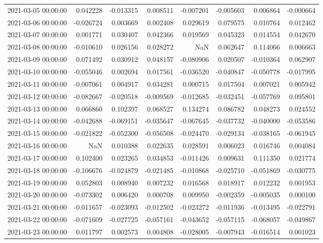\begin{tabular}{lrrrrrrr}
2021-03-05 00:00:00 & 0.042228 & -0.013315 & 0.008511 & -0.007201 & -0.005603 & 0.006864 & -0.000664 \\
2021-03-06 00:00:00 & -0.026724 & 0.003669 & 0.002408 & 0.029619 & 0.079575 & 0.010764 & 0.012462 \\
2021-03-07 00:00:00 & 0.001771 & 0.030407 & 0.042366 & 0.019569 & 0.045323 & 0.014554 & 0.042670 \\
2021-03-08 00:00:00 & -0.010610 & 0.026156 & 0.028272 & NaN & 0.062647 & 0.114066 & 0.006663 \\
2021-03-09 00:00:00 & 0.071492 & 0.030912 & 0.048157 & -0.080906 & 0.020507 & -0.010364 & 0.062907 \\
2021-03-10 00:00:00 & -0.055046 & 0.002694 & 0.017561 & -0.036520 & -0.040847 & -0.050778 & -0.017995 \\
2021-03-11 00:00:00 & -0.007061 & 0.004917 & 0.034281 & 0.000715 & 0.017504 & 0.007021 & 0.005942 \\
2021-03-12 00:00:00 & -0.082667 & -0.020518 & -0.009569 & -0.012685 & -0.032451 & -0.057769 & 0.095801 \\
2021-03-13 00:00:00 & 0.066860 & 0.102397 & 0.068527 & 0.134274 & 0.086782 & 0.048273 & 0.024552 \\
2021-03-14 00:00:00 & -0.042688 & -0.069151 & -0.035647 & -0.067645 & -0.037732 & -0.040000 & -0.053586 \\
2021-03-15 00:00:00 & -0.021822 & -0.052300 & -0.056508 & -0.024470 & -0.029134 & -0.038165 & -0.061945 \\
2021-03-16 00:00:00 & NaN & 0.010388 & 0.022635 & 0.028591 & 0.006023 & 0.016746 & 0.004084 \\
2021-03-17 00:00:00 & 0.102400 & 0.023265 & 0.034853 & -0.011426 & 0.009631 & 0.111350 & 0.021774 \\
2021-03-18 00:00:00 & -0.106676 & -0.024879 & -0.021485 & -0.010868 & -0.025710 & -0.051869 & -0.030775 \\
2021-03-19 00:00:00 & 0.052803 & 0.008940 & 0.007232 & 0.016568 & 0.018917 & 0.012232 & 0.001953 \\
2021-03-20 00:00:00 & -0.073302 & 0.006420 & 0.000708 & 0.009950 & -0.002359 & -0.005035 & 0.000100 \\
2021-03-21 00:00:00 & -0.011657 & -0.023093 & -0.012502 & -0.023272 & -0.011936 & -0.013495 & -0.022791 \\
2021-03-22 00:00:00 & -0.071609 & -0.027725 & -0.057161 & -0.043652 & -0.057115 & -0.068057 & -0.049867 \\
2021-03-23 00:00:00 & 0.011797 & 0.002573 & 0.004808 & -0.028005 & -0.007943 & -0.016514 & 0.001023 \\

\end{tabular}
